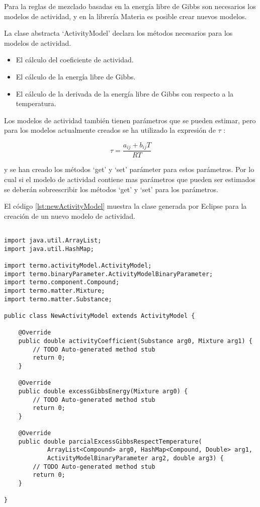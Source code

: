 	Para la reglas de mezclado basadas en la energía libre de Gibbs son necesarios los modelos de actividad, y en la librería Materia es posible crear nuevos modelos.

	La clase abstracta `ActivityModel' declara los métodos necesarios para los modelos de actividad.

	\begin{itemize}
		\item El cálculo del coeficiente de actividad.
		\item El cálculo de la energía libre de Gibbs.
		\item El cálculo de la derivada de la energía libre de Gibbs con respecto a la temperatura.
	\end{itemize}

	Los modelos de actividad también tienen parámetros que se pueden estimar, pero para los modelos actualmente creados se ha utilizado la expresión de $\tau$ :

	\begin{equation}
		\tau = \frac{a_{ij} + b_{ij} T}{R T}
	\end{equation}

	y se han creado los métodos `get' y `set' parámeter para estos parámetros. Por lo cual si el modelo de actividad contiene mas parámetros que pueden ser estimados se deberán sobreescribir los métodos `get' y `set' para los parámetros.

	El código \ref{lst:newActivityModel} muestra la clase generada por Eclipse para la creación de un nuevo modelo de actividad.

	\begin{lstlisting}[caption={Esqueleto de clase para la creación de un nuevo modelo de actividad},label={lst:newActivityModel}]

import java.util.ArrayList;
import java.util.HashMap;

import termo.activityModel.ActivityModel;
import termo.binaryParameter.ActivityModelBinaryParameter;
import termo.component.Compound;
import termo.matter.Mixture;
import termo.matter.Substance;

public class NewActivityModel extends ActivityModel {

	@Override
	public double activityCoefficient(Substance arg0, Mixture arg1) {
		// TODO Auto-generated method stub
		return 0;
	}

	@Override
	public double excessGibbsEnergy(Mixture arg0) {
		// TODO Auto-generated method stub
		return 0;
	}

	@Override
	public double parcialExcessGibbsRespectTemperature(
			ArrayList<Compound> arg0, HashMap<Compound, Double> arg1,
			ActivityModelBinaryParameter arg2, double arg3) {
		// TODO Auto-generated method stub
		return 0;
	}

}
	\end{lstlisting}


